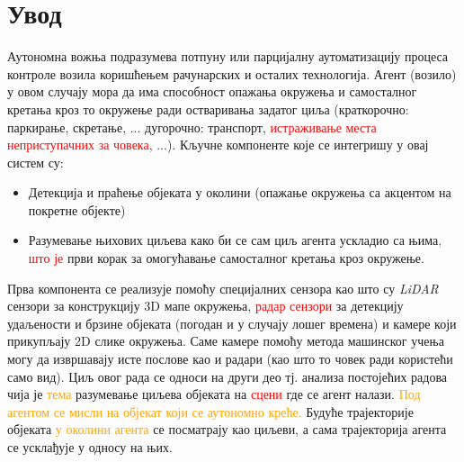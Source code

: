 \documentclass[11pt,oneside]{memoir}
\begin{document}
\frontmatter
\naslovna
\komisija
\apstrakt
\tableofcontents*

\mainmatter

\chapter{Увод}

Аутономна вожња подразумева потпуну или парцијалну аутоматизацију процеса контроле возила коришћењем рачунарских и осталих технологија. Агент (возило) 
у овом случају мора да има способност опажања окружења и самосталног кретања кроз то окружење ради остваривања задатог циља 
(краткорочно: паркирање, скретање, ... дугорочно: транспорт, \textcolor{red}{истраживање места неприступачних за човека}, ...). Кључне
компоненте које се интегришу у овај систем су:
\begin{itemize} 
  \item Детекција и праћење објеката у околини (опажање окружења са акцентом на покретне објекте) 
  \item Разумевање њихових циљева како би се сам циљ агента ускладио са њима\textcolor{red}{, што је } 
        први корак за омогућавање самосталног кретања кроз окружење.
\end{itemize} 
Прва компонента се реализује помоћу специјалних сензора као што су \textit{LiDAR} сензори за конструкцију 3D мапе окружења, 
\textcolor{red}{радар сензори}
за детекцију удаљености и брзине објеката (погодан и у случају лошег времена) и камере који прикупљају 2D слике окружења. Саме камере помоћу
метода машинског учења могу да извршавају исте послове као и радари (као што то човек ради користећи само вид). Циљ овог рада се односи на други део
тј. анализа постојећих радова чија је \textcolor{orange}{тема} разумевање циљева објеката на \textcolor{red}{сцени} где се агент налази. 
\textcolor{orange}{Под агентом се мисли на објекат који се аутономно креће.}
Будуће трајекторије објеката \textcolor{orange}{у околини агента} се посматрају као циљеви, а сама трајекторија агента се усклађује у односу на њих.
\end{document}
